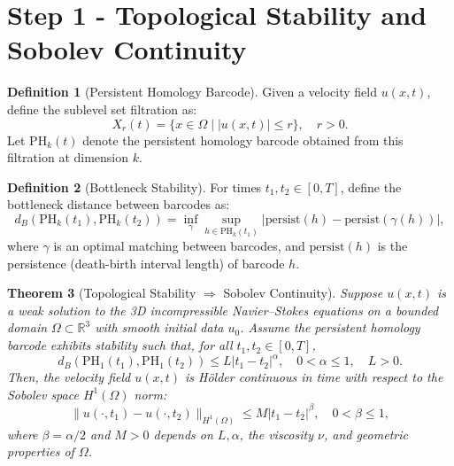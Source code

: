 \documentclass[11pt]{article}
\newtheorem{theorem}{Theorem}[section]
\theoremstyle{definition}
\newtheorem{definition}[theorem]{Definition}
\begin{document}
\section{Step 1 - Topological Stability and Sobolev Continuity}

\begin{definition}[Persistent Homology Barcode]
Given a velocity field $u(x,t)$, define the sublevel set filtration as:
\[
X_r(t) = \{x \in \Omega \mid |u(x,t)| \leq r \}, \quad r > 0.
\]
Let $\mathrm{PH}_k(t)$ denote the persistent homology barcode obtained from this filtration at dimension $k$.
\end{definition}

\begin{definition}[Bottleneck Stability]
For times $t_1, t_2 \in [0,T]$, define the bottleneck distance between barcodes as:
\[
d_B(\mathrm{PH}_k(t_1), \mathrm{PH}_k(t_2)) = \inf_{\gamma} \sup_{h \in \mathrm{PH}_k(t_1)}|\mathrm{persist}(h)-\mathrm{persist}(\gamma(h))|,
\]
where $\gamma$ is an optimal matching between barcodes, and $\mathrm{persist}(h)$ is the persistence (death-birth interval length) of barcode $h$.
\end{definition}

\begin{theorem}[Topological Stability $\Rightarrow$ Sobolev Continuity]
\label{thm:topological_sobolev_continuity}
Suppose $u(x,t)$ is a weak solution to the 3D incompressible Navier--Stokes equations on a bounded domain $\Omega \subset \mathbb{R}^3$ with smooth initial data $u_0$. Assume the persistent homology barcode exhibits stability such that, for all $t_1,t_2\in[0,T]$,
\[
d_B(\mathrm{PH}_1(t_1), \mathrm{PH}_1(t_2)) \leq L|t_1-t_2|^{\alpha}, \quad 0 < \alpha \leq 1, \quad L > 0.
\]
Then, the velocity field $u(x,t)$ is Hölder continuous in time with respect to the Sobolev space $H^1(\Omega)$ norm:
\[
\|u(\cdot,t_1)-u(\cdot,t_2)\|_{H^1(\Omega)} \leq M|t_1-t_2|^{\beta}, \quad 0<\beta\leq 1,
\]
where $\beta = \alpha/2$ and $M > 0$ depends on $L, \alpha$, the viscosity $\nu$, and geometric properties of $\Omega$.
\end{theorem}
\end{document}
